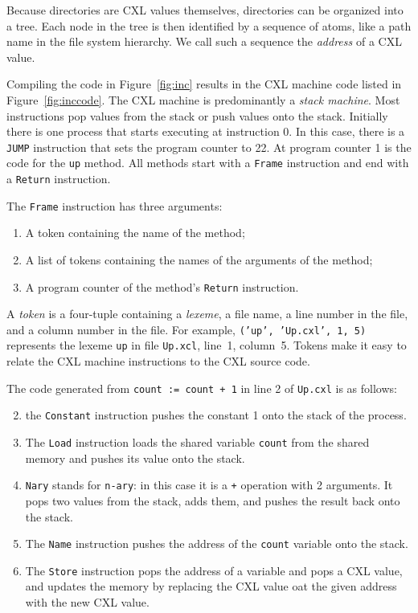 \documentclass{report}
\begin{document}
Because directories are CXL values themselves,
directories can be organized into a tree.
Each node in the tree is then identified
by a sequence of atoms, like a path name in the file system hierarchy.  We call
such a sequence the \emph{address} of a CXL value.

Compiling the code in Figure~\ref{fig:inc} results in the CXL machine code
listed in Figure~\ref{fig:inccode}.
The CXL machine is predominantly a \emph{stack machine}.
Most instructions pop values from the stack or push values onto the stack.
Initially there is one process that starts executing at instruction 0.
In this case, there is a \texttt{JUMP} instruction that sets the program
counter to 22.  At program counter 1 is the code for the \texttt{up} method.
All methods start with a \texttt{Frame} instruction and end with a \texttt{Return}
instruction.

The \texttt{Frame} instruction has three arguments:
\begin{enumerate}
\item A token containing the name of the method;
\item A list of tokens containing the names of the arguments of the method;
\item A program counter of the method's \texttt{Return} instruction.
\end{enumerate}

A \emph{token} is a four-tuple containing a \emph{lexeme}, a file name, a
line number in the file, and a column number in the file.  For example,
\texttt{(’up’, ’Up.cxl’, 1, 5)} represents the lexeme \texttt{up} in
file \texttt{Up.xcl}, line~1, column~5.  Tokens make it easy to relate
the CXL machine instructions to the CXL source code.

The code generated from \texttt{count := count + 1} in line 2 of
\texttt{Up.cxl} is as follows:

\begin{enumerate} \setcounter{enumi}{1}
\item the \texttt{Constant} instruction pushes the constant 1
onto the stack of the process.
\item The \texttt{Load} instruction loads the shared variable
\texttt{count} from the shared memory and pushes its value onto the
stack.
\item \texttt{Nary} stands for \texttt{n-ary}: in this case it is a \texttt{+}
operation with 2 arguments.  It pops two values from the stack, adds them,
and pushes the result back onto the stack.
\item The \texttt{Name} instruction pushes the address of the \texttt{count}
variable onto the stack.
\item The \texttt{Store} instruction pops the address of a variable and pops
a CXL value, and updates the memory by replacing the CXL value oat the given
address with the new CXL value.
\end{enumerate}
\end{document}
